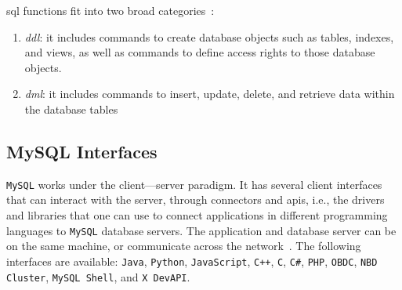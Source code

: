 \gls{sql} functions fit into two broad categories~\cite{coronel2016database}:
\begin{enumerate}
\item \emph{\gls{ddl}}: it includes commands to create database objects
  such as tables, indexes, and views, as well as commands to define access
  rights to those database objects.
\item \emph{\gls{dml}}: it includes commands to insert, update, delete,
  and retrieve data within the database tables
\end{enumerate}
%
%

\subsection{MySQL Interfaces}%
\label{sec:c++-connector}
\texttt{MySQL} works under the client---server paradigm. It has several client
interfaces that can interact with the server, through connectors and
\glspl{api}, i.e., the drivers and libraries that one can use to connect
applications in different programming languages to \texttt{MySQL} database
servers.
The application and database server can be on the same machine, or communicate
across the network~\cite{MysqlConnAPIs}.
The following interfaces are available: \texttt{Java}, \texttt{Python},
\texttt{JavaScript}, \texttt{C++}, \texttt{C},
\texttt{C\#},
\texttt{PHP},
\texttt{OBDC}, \texttt{NBD Cluster},
\texttt{MySQL Shell}, and \texttt{X DevAPI}.

